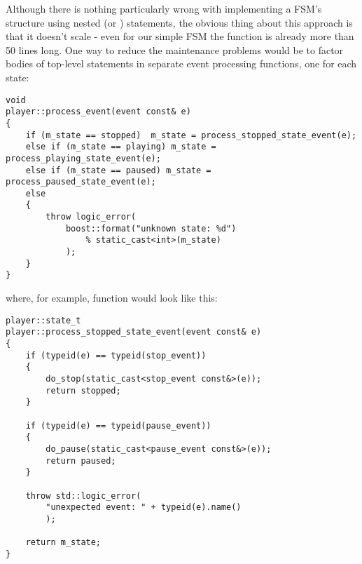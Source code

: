 \documentclass{kapproc}
\begin{document}

Although there is nothing particularly wrong with implementing 
a FSM's structure using nested  (or )
statements, the obvious thing about this approach is that it 
doesn't scale - even for our simple FSM the 
 function is already more than 50 lines
long. One way to reduce the maintenance problems would be to 
factor bodies of top-level  statements in separate 
event processing functions, one for each state:


{\small
\begin{codesamp}\begin{verbatim}
void
player::process_event(event const& e)
{
    if (m_state == stopped)  m_state = process_stopped_state_event(e);
    else if (m_state == playing) m_state = process_playing_state_event(e);
    else if (m_state == paused) m_state = process_paused_state_event(e);
    else
    {
        throw logic_error(
            boost::format("unknown state: %d")
                % static_cast<int>(m_state)
            );
    }
}
\end{verbatim}
\end{codesamp}
}

where, for example,  
function would look like this:

{\small
\begin{codesamp}\begin{verbatim}
player::state_t
player::process_stopped_state_event(event const& e)
{
    if (typeid(e) == typeid(stop_event))
    {
        do_stop(static_cast<stop_event const&>(e));
        return stopped;
    }

    if (typeid(e) == typeid(pause_event))
    {
        do_pause(static_cast<pause_event const&>(e));
        return paused;
    }

    throw std::logic_error(
        "unexpected event: " + typeid(e).name()
        );

    return m_state;
}
\end{verbatim}
\end{codesamp}
}
\end{document}
